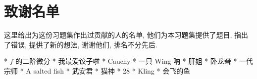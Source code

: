 \section{致谢名单}

这里给出为这份习题集作出过贡献的人的名单, 他们为本习题集提供了题目, 指出了错误, 提供了新的想法, 谢谢他们, 排名不分先后. 
\begin{THANKS}
    * $ f $ 的二阶微分
    * 我最爱饺子啦
    * Cauchy 
    * 一只 Wing 呐
    * 肝姐
    * 卧龙聋
    * 一代宗师
    * A salted fish
    * 武安君
    * 猫神
    * 28 
    * Kling
    * 会飞的鱼
\end{THANKS}